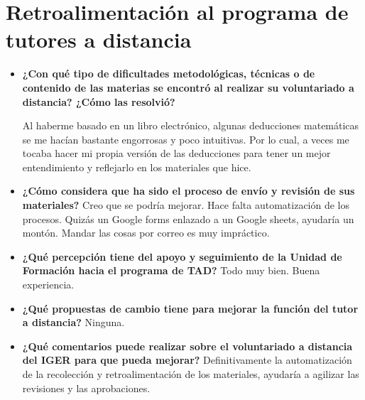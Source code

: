 \documentclass[a4paper, 12pt]{article}
\begin{document}
\section{Retroalimentación al programa de tutores a distancia}

\begin{itemize}
    \item \textbf{¿Con qué tipo de dificultades metodológicas, técnicas o de contenido de las
    materias se encontró al realizar su voluntariado a distancia? ¿Cómo las
    resolvió?}

    Al haberme basado en un libro electrónico, algunas deducciones matemáticas se me hacían bastante engorrosas y poco intuitivas. Por lo cual, a veces me tocaba hacer mi propia versión de las deducciones para tener un mejor entendimiento y reflejarlo en los materiales que hice. 
    \item \textbf{¿Cómo considera que ha sido el proceso de envío y revisión de sus materiales?}
    Creo que se podría mejorar. Hace falta automatización de los procesos. Quizás un Google forms enlazado a un Google sheets, ayudaría un montón. Mandar las cosas por correo es muy impráctico. 
    \item \textbf{¿Qué percepción tiene del apoyo y seguimiento de la Unidad de Formación
    hacia el programa de TAD?}
    Todo muy bien. Buena experiencia. 
    \item \textbf{¿Qué propuestas de cambio tiene para mejorar la función del tutor a
    distancia?}
    Ninguna. 
    \item \textbf{¿Qué comentarios puede realizar sobre el voluntariado a distancia del IGER
    para que pueda mejorar?}
    Definitivamente la automatización de la recolección y retroalimentación de los materiales, ayudaría a agilizar las revisiones y las aprobaciones.
\end{itemize}




\newpage
\end{document}
